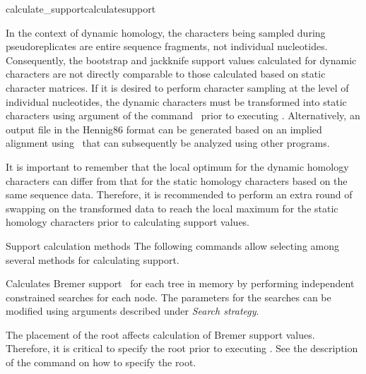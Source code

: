 \begin{command}{calculate\_support}{calculatesupport}
\begin{poydescription}
            \begin{statement}
                In the context of dynamic
                homology, the characters being sampled during pseudoreplicates
                are entire sequence fragments, not individual nucleotides.
                Consequently, the bootstrap and jackknife support values
                calculated for dynamic characters are not directly comparable to
                those calculated based on static character matrices. If it is
                desired to perform character sampling at the level of
                individual nucleotides, the dynamic characters must be
                transformed into static characters using 
                argument of the command~
                prior to executing .
                Alternatively, an output file in the Hennig86 format can be
                generated based on an implied alignment
                using~ that can subsequently be analyzed
                using other programs.
                                
                It is important to remember that the local optimum for the dynamic
                homology characters can differ from that for the static homology characters
                based on the same sequence data. Therefore, it is recommended to perform an extra round of swapping on the
                 transformed data to reach the local maximum for the static
                 homology characters prior to calculating support values.
            \end{statement}
            
            \end{poydescription}

	\begin{arguments}
		\begin{argumentgroup}{Support calculation methods}
            {The following commands allow selecting among several methods for
            calculating support.} 

                {Calculates Bremer support~\cite{Bremer1988, Kallersjoetal1992}
                for each tree in memory by performing independent constrained searches for each
                node. The parameters for the searches can be modified using arguments
                described under \emph{Search strategy}.} 
                {}
\begin{statement}
  	  The placement of the root affects calculation of Bremer support values.
	  Therefore, it is critical to specify the root prior to executing
	  . See the description of the
	  command  on how to specify the root.
	\end{statement}


\end{argumentgroup}
\end{arguments}
\end{command}
